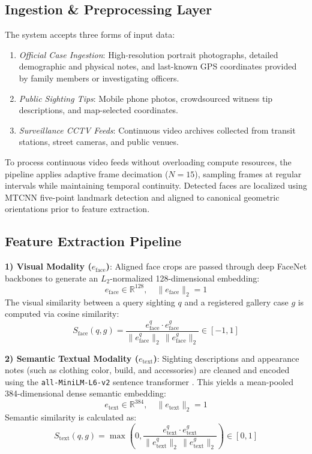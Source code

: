 \documentclass[conference]{IEEEtran}
\begin{document}
\subsection{Ingestion \& Preprocessing Layer}
The system accepts three forms of input data:
\begin{enumerate}
    \item \textit{Official Case Ingestion}: High-resolution portrait photographs, detailed demographic and physical notes, and last-known GPS coordinates provided by family members or investigating officers.
    \item \textit{Public Sighting Tips}: Mobile phone photos, crowdsourced witness tip descriptions, and map-selected coordinates.
    \item \textit{Surveillance CCTV Feeds}: Continuous video archives collected from transit stations, street cameras, and public venues.
\end{enumerate}

To process continuous video feeds without overloading compute resources, the pipeline applies adaptive frame decimation ($N=15$), sampling frames at regular intervals while maintaining temporal continuity. Detected faces are localized using MTCNN five-point landmark detection and aligned to canonical geometric orientations prior to feature extraction.

\subsection{Feature Extraction Pipeline}
\textbf{1) Visual Modality ($e_{\text{face}}$)}: Aligned face crops are passed through deep FaceNet backbones \cite{ref_facenet} to generate an $L_2$-normalized 128-dimensional embedding:
\begin{equation}
e_{\text{face}} \in \mathbb{R}^{128}, \quad \|e_{\text{face}}\|_2 = 1
\end{equation}
The visual similarity between a query sighting $q$ and a registered gallery case $g$ is computed via cosine similarity:
\begin{equation}
S_{\text{face}}(q, g) = \frac{e_{\text{face}}^q \cdot e_{\text{face}}^g}{\|e_{\text{face}}^q\|_2 \, \|e_{\text{face}}^g\|_2} \in [-1, 1]
\end{equation}

\textbf{2) Semantic Textual Modality ($e_{\text{text}}$)}: Sighting descriptions and appearance notes (such as clothing color, build, and accessories) are cleaned and encoded using the \texttt{all-MiniLM-L6-v2} sentence transformer \cite{ref_sbert}. This yields a mean-pooled 384-dimensional dense semantic embedding:
\begin{equation}
e_{\text{text}} \in \mathbb{R}^{384}, \quad \|e_{\text{text}}\|_2 = 1
\end{equation}
Semantic similarity is calculated as:
\begin{equation}
S_{\text{text}}(q, g) = \max\left(0, \frac{e_{\text{text}}^q \cdot e_{\text{text}}^g}{\|e_{\text{text}}^q\|_2 \, \|e_{\text{text}}^g\|_2}\right) \in [0, 1]
\end{equation}
\end{document}
